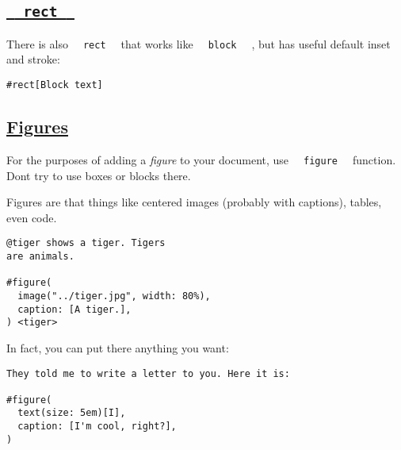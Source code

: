 \subsection{\texorpdfstring{\hyperref[rect]{\texttt{\ }{\texttt{\ rect\ }}\texttt{\ }}}{  rect  }}\label{rect}

There is also \texttt{\ }{\texttt{\ rect\ }}\texttt{\ } that works like
\texttt{\ }{\texttt{\ block\ }}\texttt{\ } , but has useful default
inset and stroke:

\begin{verbatim}
#rect[Block text]
\end{verbatim}

\pandocbounded{}

\subsection{\texorpdfstring{\hyperref[figures]{Figures}}{Figures}}\label{figures}

For the purposes of adding a \emph{figure} to your document, use
\texttt{\ }{\texttt{\ figure\ }}\texttt{\ } function.
Don\textquotesingle t try to use boxes or blocks there.

Figures are that things like centered images (probably with captions),
tables, even code.

\begin{verbatim}
@tiger shows a tiger. Tigers
are animals.

#figure(
  image("../tiger.jpg", width: 80%),
  caption: [A tiger.],
) <tiger>
\end{verbatim}

\pandocbounded{}

In fact, you can put there anything you want:

\begin{verbatim}
They told me to write a letter to you. Here it is:

#figure(
  text(size: 5em)[I],
  caption: [I'm cool, right?],
) 
\end{verbatim}

\pandocbounded{}


